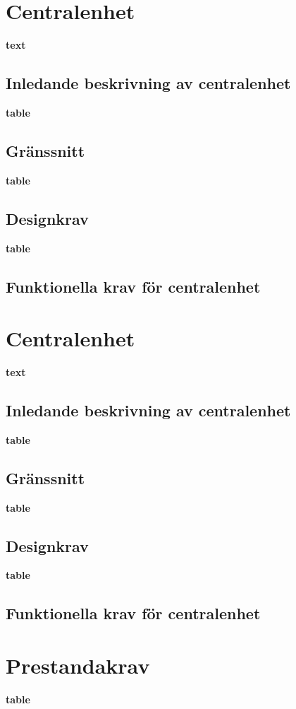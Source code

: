 \documentclass[a4paper,titlepage,12pt]{article}
\begin{document}

	\section{Centralenhet}
	\textbf{text}
	\subsection{Inledande beskrivning av centralenhet}
	\textbf{table}
	\subsection{Gränssnitt}
	\textbf{table}
	\subsection{Designkrav}
	\textbf{table}
	\subsection{Funktionella krav för centralenhet}


	\section{Centralenhet}
	\textbf{text}
	\subsection{Inledande beskrivning av centralenhet}
	\textbf{table}
	\subsection{Gränssnitt}
	\textbf{table}
	\subsection{Designkrav}
	\textbf{table}
	\subsection{Funktionella krav för centralenhet}
	\section{Prestandakrav}
	\textbf{table}
\end{document}
